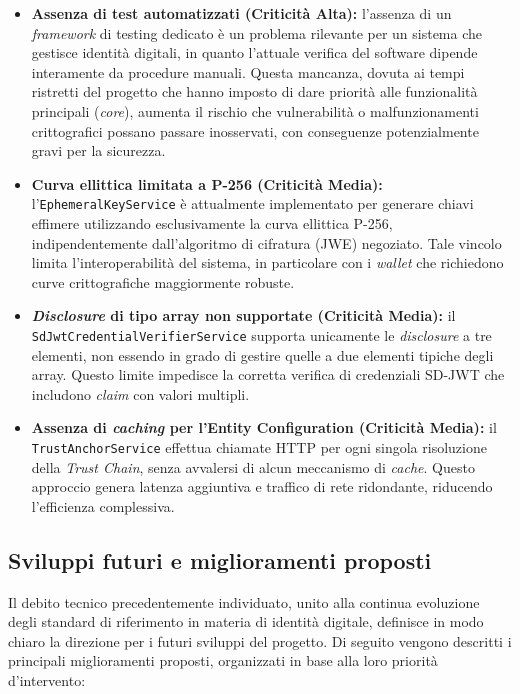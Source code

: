 \begin{itemize}
    \item \textbf{Assenza di test automatizzati (Criticità Alta):} l'assenza di un \textit{framework} di testing dedicato è un problema rilevante per un sistema che gestisce identità digitali, in quanto l'attuale verifica del software dipende interamente da procedure manuali. Questa mancanza, dovuta ai tempi ristretti del progetto che hanno imposto di dare priorità alle funzionalità principali (\textit{core}), aumenta il rischio che vulnerabilità o malfunzionamenti crittografici possano passare inosservati, con conseguenze potenzialmente gravi per la sicurezza.
    
    \item \textbf{Curva ellittica limitata a P-256 (Criticità Media):} l'\texttt{EphemeralKeyService} è attualmente implementato per generare chiavi effimere utilizzando esclusivamente la curva ellittica P-256, indipendentemente dall'algoritmo di cifratura (JWE) negoziato. Tale vincolo limita l'interoperabilità del sistema, in particolare con i \textit{wallet} che richiedono curve crittografiche maggiormente robuste.
    
    \item \textbf{\textit{Disclosure} di tipo array non supportate (Criticità Media):} il \texttt{SdJwtCredentialVerifierService} supporta unicamente le \textit{disclosure} a tre elementi, non essendo in grado di gestire quelle a due elementi tipiche degli array. Questo limite impedisce la corretta verifica di credenziali SD-JWT che includono \textit{claim} con valori multipli.
    
    \item \textbf{Assenza di \textit{caching} per l'Entity Configuration (Criticità Media):} il \texttt{TrustAnchorService} effettua chiamate HTTP per ogni singola risoluzione della \textit{Trust Chain}, senza avvalersi di alcun meccanismo di \textit{cache}. Questo approccio genera latenza aggiuntiva e traffico di rete ridondante, riducendo l'efficienza complessiva.
\end{itemize}

\subsection{Sviluppi futuri e miglioramenti proposti}
Il debito tecnico precedentemente individuato, unito alla continua evoluzione degli standard di riferimento in materia di identità digitale, definisce in modo chiaro la direzione per i futuri sviluppi del progetto. Di seguito vengono descritti i principali miglioramenti proposti, organizzati in base alla loro priorità d'intervento:

